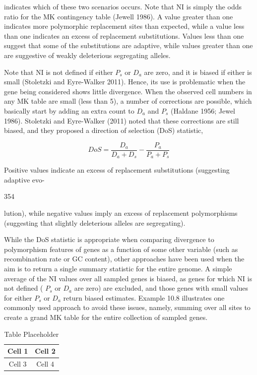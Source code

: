 \documentclass{article}
\begin{document}
indicates which of these two scenarios occurs. Note that NI is simply the odds ratio for the MK contingency table (Jewell 1986). A value greater than one indicates more polymorphic replacement sites than expected, while a value less than one indicates an excess of replacement substitutions. Values less than one suggest that some of the substitutions are adaptive, while values greater than one are suggestive of weakly deleterious segregating alleles.

Note that NI is not defined if either  $ P_{s} $ or  $ D_{a} $ are zero, and it is biased if either is small (Stoletzki and Eyre-Walker 2011). Hence, its use is problematic when the gene being considered shows little divergence. When the observed cell numbers in any MK table are small (less than 5), a number of corrections are possible, which basically start by adding an extra count to  $ D_{a} $ and  $ P_{s} $ (Haldane 1956; Jewel 1986). Stoletzki and Eyre-Walker (2011) noted that these corrections are still biased, and they proposed a direction of selection (DoS) statistic,

\begin{equation}
DoS=\frac{D_{a}}{D_{a}+D_{s}}-\frac{P_{a}}{P_{a}+P_{s}}
\tag{10.6b}
\label{eq:10_6b}
\end{equation}

Positive values indicate an excess of replacement substitutions (suggesting adaptive evo-

354

lution), while negative values imply an excess of replacement polymorphisms (suggesting that slightly deleterious alleles are segregating).

While the DoS statistic is appropriate when comparing divergence to polymorphism features of genes as a function of some other variable (such as recombination rate or GC content), other approaches have been used when the aim is to return a single summary statistic for the entire genome. A simple average of the NI values over all sampled genes is biased, as genes for which NI is not defined ( $ P_{s} $ or  $ D_{a} $ are zero) are excluded, and those genes with small values for either  $ P_{s} $ or  $ D_{a} $ return biased estimates. Example 10.8 illustrates one commonly used approach to avoid these issues, namely, summing over all sites to create a grand MK table for the entire collection of sampled genes.

\begin{table}[h]
\centering
\begin{tabular}{|c|c|}
\hline
Cell 1 & Cell 2 \\
\hline
Cell 3 & Cell 4 \\
\hline
\end{tabular}
\caption{Table Placeholder}
\end{table}
\end{document}
